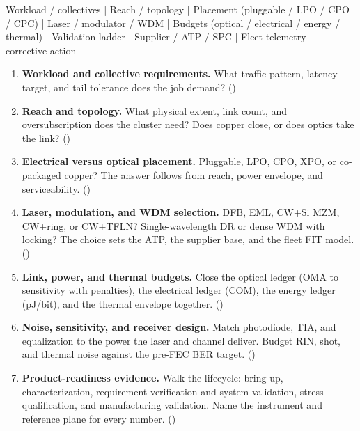 \begin{dectree}
Workload / collectives
  |
Reach / topology
  |
Placement (pluggable / LPO / CPO / CPC)
  |
Laser / modulator / WDM
  |
Budgets (optical / electrical / energy / thermal)
  |
Validation ladder
  |
Supplier / ATP / SPC
  |
Fleet telemetry + corrective action
\end{dectree}

\begin{enumerate}
\item \textbf{Workload and collective requirements.} What traffic pattern, latency
      target, and tail tolerance does the job demand?
      ()
\item \textbf{Reach and topology.} What physical extent, link count, and
      oversubscription does the cluster need? Does copper close, or does optics
      take the link? ()
\item \textbf{Electrical versus optical placement.} Pluggable, LPO, CPO, XPO, or
      co-packaged copper? The answer follows from reach, power envelope, and
      serviceability. ()
\item \textbf{Laser, modulation, and WDM selection.} DFB, EML, CW+Si MZM, CW+ring,
      or CW+TFLN? Single-wavelength DR or dense WDM with locking? The choice sets
      the ATP, the supplier base, and the fleet FIT model.
      ()
\item \textbf{Link, power, and thermal budgets.} Close the optical ledger (OMA to
      sensitivity with penalties), the electrical ledger (COM), the energy ledger
      (pJ/bit), and the thermal envelope together.
      ()
\item \textbf{Noise, sensitivity, and receiver design.} Match photodiode, TIA, and
      equalization to the power the laser and channel deliver. Budget RIN, shot,
      and thermal noise against the pre-FEC BER target.
      ()
\item \textbf{Product-readiness evidence.} Walk the lifecycle: bring-up,
      characterization, requirement verification and system validation, stress
      qualification, and manufacturing validation. Name the instrument and
      reference plane for every number.
      ()

\end{enumerate}
